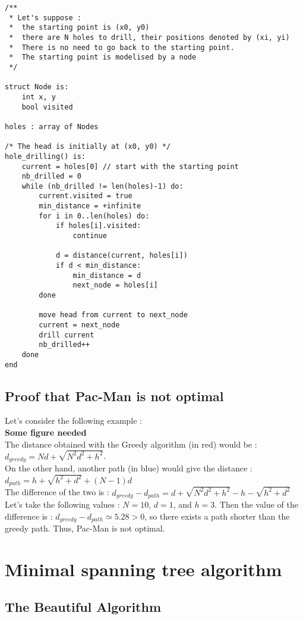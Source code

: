 \documentclass[11pt]{article}
\begin{document}
\begin{lstlisting}
/**
 * Let's suppose :
 *	the starting point is (x0, y0)
 *	there are N holes to drill, their positions denoted by (xi, yi) 
 *	There is no need to go back to the starting point.
 *	The starting point is modelised by a node
 */

struct Node is:
	int x, y
	bool visited

holes : array of Nodes

/* The head is initially at (x0, y0) */
hole_drilling() is:
	current = holes[0] // start with the starting point
	nb_drilled = 0
	while (nb_drilled != len(holes)-1) do:
		current.visited = true
		min_distance = +infinite
		for i in 0..len(holes) do:
			if holes[i].visited:
				continue

			d = distance(current, holes[i])
			if d < min_distance:
				min_distance = d
				next_node = holes[i]
		done

		move head from current to next_node
		current = next_node
		drill current
		nb_drilled++
	done
end
\end{lstlisting}

\subsection{Proof that Pac-Man is not optimal}
Let's consider the following example :\\
\textbf{Some figure needed}\\

The distance obtained with the Greedy algorithm (in red) would be :
$d_{greedy} = Nd + \sqrt{N^2 d^2 + h^2}$.\\
On the other hand, another path (in blue) would give the distance :
$d_{path} = h + \sqrt{h^2 + d^2} + (N-1) d$\\
The difference of the two is :
$d_{greedy} - d_{path} = d + \sqrt{N^2 d^2 + h^2} - h - \sqrt{h^2 + d^2}$\\

Let's take the following values : $N = 10$, $d = 1$, and $h = 3$.
Then the value of the difference is : $d_{greedy} - d_{path} \simeq 5.28 > 0$, 
so there exists a path shorter than the greedy path.
Thus, Pac-Man is not optimal.

\section{Minimal spanning tree algorithm}

\subsection{The Beautiful Algorithm}
\end{document}
